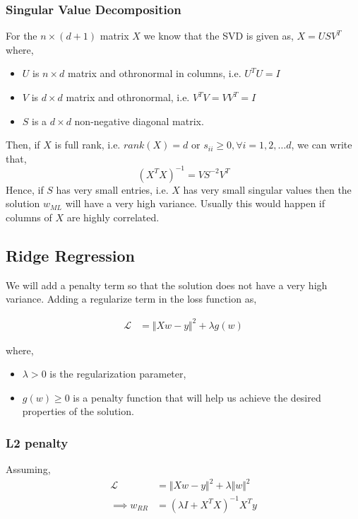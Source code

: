 \documentclass{article}
\begin{document}
\subsubsection{Singular Value Decomposition}
For the $n \times (d+1)$ matrix $X$ we know that the SVD is given as, $X=USV^T$ where,
\begin{itemize}
    \item $U$ is $n \times d$ matrix and othronormal in columns, i.e. $U^TU=I$
    \item $V$ is $d \times d$ matrix and othronormal, i.e. $V^TV=VV^T=I$
    \item $S$ is a $d\times d$ non-negative diagonal matrix.
\end{itemize}

Then, if $X$ is full rank, i.e. $rank(X)=d$ or $s_{ii}\geq0, \forall i=1,2,\dots d$, we can write that, $$(X^TX)^{-1}=VS^{-2}V^T$$
Hence, if $S$ has very small entries, i.e. $X$ has very small singular values then the solution $w_{ML}$ will have a very high variance. Usually this would happen if columns of $X$ are highly correlated.

\subsection{Ridge Regression}

We will add a penalty term so that the solution does not have a very high variance. Adding a regularize term in the loss function as,

\begin{align*}
    \mathcal{L} &= \Vert Xw-y \Vert^2 + \lambda g(w)
\end{align*}

where,
\begin{itemize}
    \item $\lambda>0$ is the regularization parameter,
    \item $g(w) \geq 0$ is a penalty function that will help us achieve the desired properties of the solution.
\end{itemize} 

\subsubsection{L2 penalty}

Assuming,
\begin{align*}
    \mathcal{L} &= \Vert Xw-y \Vert^2 + \lambda \Vert w \Vert^2\\
    \implies w_{RR} &= (\lambda I + X^TX)^{-1}X^Ty\\
\end{align*}
\end{document}
